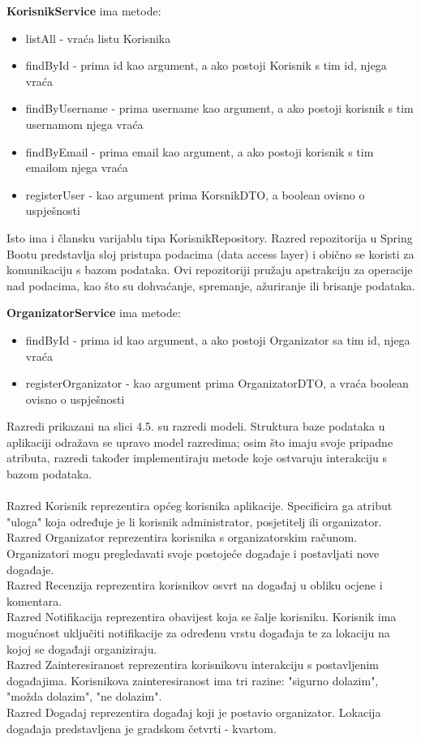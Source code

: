 			\textbf{KorisnikService} ima metode: 
			\begin{itemize}
				\item listAll - vraća listu Korisnika
				\item findById - prima id kao argument, a ako postoji Korisnik s tim id, njega vraća
				\item findByUsername - prima username kao argument, a ako postoji korisnik s tim usernamom njega vraća
				\item findByEmail - prima email kao argument, a ako postoji korisnik s tim emailom njega vraća
				\item registerUser - kao argument prima KorsnikDTO, a boolean ovisno o uspješnosti
			\end{itemize}
			
			Isto ima i člansku varijablu tipa KorisnikRepository. Razred repozitorija u Spring Bootu predstavlja sloj pristupa podacima (data access layer) i obično se koristi za komunikaciju s bazom podataka. Ovi repozitoriji pružaju apstrakciju za operacije nad podacima, kao što su dohvaćanje, spremanje, ažuriranje ili brisanje podataka.
			\newline
			
			\textbf{OrganizatorService} ima metode: 
			\begin{itemize}
				\item findById - prima id kao argument, a ako postoji Organizator sa tim id, njega vraća
				\item registerOrganizator - kao argument prima OrganizatorDTO, a vraća boolean ovisno o uspješnosti
			\end{itemize}
			
			Razredi prikazani na slici 4.5. su razredi modeli. Struktura baze podataka u aplikaciji odražava se upravo model razredima; osim što imaju svoje pripadne atributa, razredi također implementiraju metode koje ostvaruju interakciju s bazom podataka. \\ 
			\\ Razred Korisnik reprezentira općeg korisnika aplikacije. Specificira ga atribut "uloga" koja određuje je li korisnik administrator, posjetitelj ili organizator.
			\\ Razred Organizator reprezentira korisnika s organizatorskim računom. Organizatori mogu pregledavati svoje postojeće događaje i postavljati nove događaje.
			\\ Razred Recenzija reprezentira korisnikov osvrt na događaj u obliku ocjene i komentara.
			\\ Razred Notifikacija reprezentira obavijest koja se šalje korisniku. Korisnik ima mogućnost uključiti notifikacije za određenu vrstu događaja te za lokaciju na kojoj se događaji organiziraju.
			\\ Razred Zainteresiranost reprezentira korisnikovu interakciju s postavljenim događajima. Korisnikova zainteresiranost ima tri razine: "sigurno dolazim", "možda dolazim", "ne dolazim".
			\\ Razred Dogadaj reprezentira događaj koji je postavio organizator. Lokacija događaja predstavljena je gradskom četvrti - kvartom.
			
